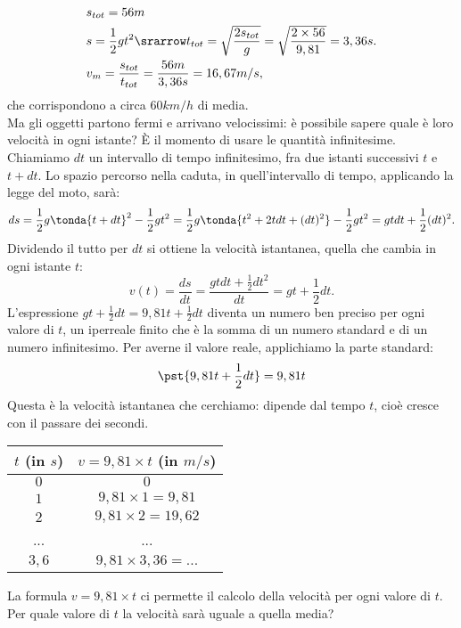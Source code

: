 \begin{align*}
 & s_{tot} = 56m\\
 & s =\frac{1}{2}gt^2 \srarrow t_{tot}= \sqrt{\frac{2s_{tot}}{g}}=
 \sqrt{\frac{2\times 56}{9,81}}=3,36 s.\\
 & v_m= \frac{s_{tot}}{t_{tot}}=\frac{56 m}{3,36 s}=16,67 m/s,
\end{align*}
che corrispondono a circa $60 km/h$ di media.\\
Ma gli oggetti partono fermi e arrivano velocissimi: 
è possibile sapere quale è loro velocità in ogni istante? È il momento
di usare le quantità infinitesime.\\
Chiamiamo $dt$ un intervallo di tempo infinitesimo, fra due istanti successivi
$t$ e $t+dt$.
Lo spazio percorso nella caduta, in quell'intervallo di tempo, applicando la legge del 
moto, sarà:
\[
 ds=\frac{1}{2}g\tonda{t+dt}^2-\frac{1}{2}gt^2=
 \frac{1}{2}g\tonda{t^2+2tdt+(dt)^2}-\frac{1}{2}gt^2=
 gtdt+\frac{1}{2}(dt)^2. 
\]
Dividendo il tutto per $dt$ si ottiene la velocità istantanea, quella che cambia
in ogni istante $t$:
\[
 v(t)=\frac{ds}{dt}=\frac{gtdt+\frac{1}{2}dt^2}{dt}=gt+\frac{1}{2}dt.
\]
L'espressione $gt+\frac{1}{2}dt=9,81t+\frac{1}{2}dt$ diventa un numero ben
preciso per ogni valore di $t$, un iperreale finito che è la
somma di un numero standard e di un numero infinitesimo. 
Per averne il valore reale, applichiamo la parte standard:
\[
 \pst{9,81t+\frac{1}{2}dt}=9,81t
\]
Questa è la velocità istantanea che cerchiamo: dipende dal tempo $t$,
cioè cresce con il passare dei secondi. 

\begin{center}
\begin{tabular}{cc}\toprule
$t$ (in $s$) & $v=9,81\times t$ (in $m/s$) \\\midrule
$0$ & $0$  \\
$1$ & $9,81\times 1 =9,81$ \\
$2$ & $9,81\times 2 =19,62$ \\
... & ... \\
$3,6$ & $9,81\times 3,36= ...$\\\bottomrule
\end{tabular}
\label{tab:diff_velocita}
\end{center}

La formula $v=9,81\times t$ ci permette il calcolo della velocità per ogni valore di $t$.
Per quale valore di \(t\) la velocità sarà uguale a quella media? 


